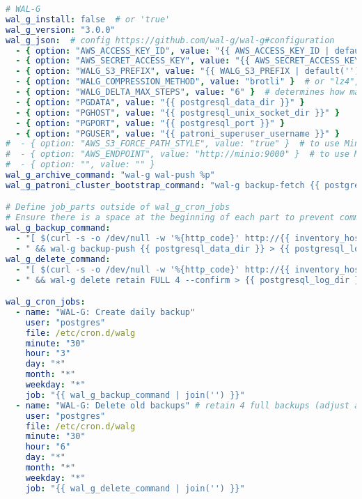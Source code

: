 \begin{flushleft}
\begin{lstlisting}[language=yaml, caption=Testsystem - Deployment - main.yml,captionpos=b,label={lst:testsystem-deployment-main.yml},breaklines=true]
# WAL-G
wal_g_install: false  # or 'true'
wal_g_version: "3.0.0"
wal_g_json:  # config https://github.com/wal-g/wal-g#configuration
  - { option: "AWS_ACCESS_KEY_ID", value: "{{ AWS_ACCESS_KEY_ID | default('') }}" }  # define values or pass via --extra-vars
  - { option: "AWS_SECRET_ACCESS_KEY", value: "{{ AWS_SECRET_ACCESS_KEY | default('') }}" }  # define values or pass via --extra-vars
  - { option: "WALG_S3_PREFIX", value: "{{ WALG_S3_PREFIX | default('') }}" } # define values or pass via --extra-vars
  - { option: "WALG_COMPRESSION_METHOD", value: "brotli" }  # or "lz4", "lzma", "zstd"
  - { option: "WALG_DELTA_MAX_STEPS", value: "6" }  # determines how many delta backups can be between full backups
  - { option: "PGDATA", value: "{{ postgresql_data_dir }}" }
  - { option: "PGHOST", value: "{{ postgresql_unix_socket_dir }}" }
  - { option: "PGPORT", value: "{{ postgresql_port }}" }
  - { option: "PGUSER", value: "{{ patroni_superuser_username }}" }
#  - { option: "AWS_S3_FORCE_PATH_STYLE", value: "true" }  # to use Minio.io S3-compatible storage
#  - { option: "AWS_ENDPOINT", value: "http://minio:9000" }  # to use Minio.io S3-compatible storage
#  - { option: "", value: "" }
wal_g_archive_command: "wal-g wal-push %p"
wal_g_patroni_cluster_bootstrap_command: "wal-g backup-fetch {{ postgresql_data_dir }} LATEST"

# Define job_parts outside of wal_g_cron_jobs
# Ensure there is a space at the beginning of each part to prevent commands from concatenating.
wal_g_backup_command:
  - "[ $(curl -s -o /dev/null -w '%{http_code}' http://{{ inventory_hostname }}:{{ patroni_restapi_port }}) = '200' ]"
  - " && wal-g backup-push {{ postgresql_data_dir }} > {{ postgresql_log_dir }}/walg_backup.log 2>&1"
wal_g_delete_command:
  - "[ $(curl -s -o /dev/null -w '%{http_code}' http://{{ inventory_hostname }}:{{ patroni_restapi_port }}) = '200' ]"
  - " && wal-g delete retain FULL 4 --confirm > {{ postgresql_log_dir }}/walg_delete.log 2>&1"

wal_g_cron_jobs:
  - name: "WAL-G: Create daily backup"
    user: "postgres"
    file: /etc/cron.d/walg
    minute: "30"
    hour: "3"
    day: "*"
    month: "*"
    weekday: "*"
    job: "{{ wal_g_backup_command | join('') }}"
  - name: "WAL-G: Delete old backups" # retain 4 full backups (adjust according to your company's backup retention policy)
    user: "postgres"
    file: /etc/cron.d/walg
    minute: "30"
    hour: "6"
    day: "*"
    month: "*"
    weekday: "*"
    job: "{{ wal_g_delete_command | join('') }}"


\end{lstlisting}
\end{flushleft}
